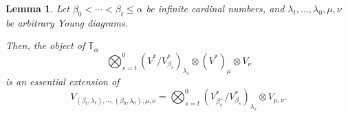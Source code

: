 \documentclass[11pt]{article}
\theoremstyle{plain}
\newtheorem{lemma}{Lemma}[section]
\theoremstyle{nonumberplain}
\theoremstyle{plain}
\theoremstyle{nonumberplain}
\newcommand\bT{\mathbb T}
\begin{document}
\begin{lemma}\label{le.ess}
  Let $\beta_0<\cdots<\beta_t\le \alpha$ be infinite cardinal numbers,
  and $\lambda_t,\ldots,\lambda_0,\mu,\nu$ be arbitrary Young diagrams.

  Then, the object of $\bT_\alpha$
  \begin{equation}\label{eq:injective}
    \bigotimes_{s=t}^0 (V^*/V^*_{\beta_s})_{\lambda_s}\otimes (V^*)_{\mu}\otimes V_{\nu}
  \end{equation}
is an essential extension of   
  \begin{equation}\label{eq:simple}
  V_{(\beta_t,\lambda_t),\cdots,(\beta_0,\lambda_0),\mu,\nu}=\bigotimes_{s=t}^0 (V^*_{\beta_s^+}/V^*_{\beta_s})_{\lambda_s}\otimes V_{\mu,\nu}.
\end{equation}
\end{lemma}
\end{document}
